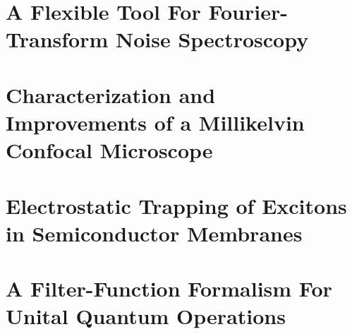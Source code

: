\documentclass[
	a4paper, %
	fontsize=10pt, %
	twoside=true, %
	numbers=noenddot, %
	fontmethod=modern, %
	listing=minted
]{kaobook}
\begin{document}
% 

\part{A Flexible \python Tool For Fourier-Transform Noise Spectroscopy}\label{part:speck}






\part{Characterization and Improvements of a Millikelvin Confocal Microscope}\label{part:setup}

\part{Electrostatic Trapping of Excitons in Semiconductor Membranes}\label{part:exp}

\part{A Filter-Function Formalism For Unital Quantum Operations}\label{part:ff}






\appendix %

\label{part:appendix}




\backmatter %
\end{document}

